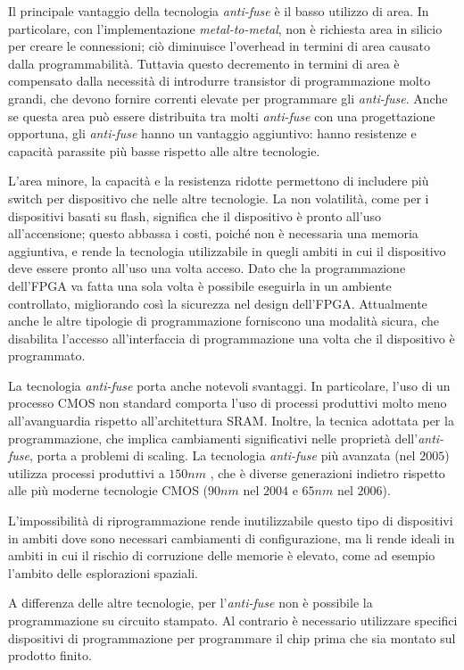 Il principale vantaggio della tecnologia \textit{anti-fuse} è il basso utilizzo di area. In particolare, con l'implementazione \textit{metal-to-metal}, non è richiesta area in silicio per creare le connessioni; ciò diminuisce l'overhead in termini di area causato dalla programmabilità. Tuttavia questo decremento in termini di area è compensato dalla necessità di introdurre transistor di programmazione molto grandi, che devono fornire correnti elevate per programmare gli \textit{anti-fuse}. Anche se questa area può essere distribuita tra molti \textit{anti-fuse} con una progettazione opportuna, gli \textit{anti-fuse} hanno un vantaggio aggiuntivo: hanno resistenze e capacità parassite più basse rispetto alle altre tecnologie.

L'area minore, la capacità e la resistenza ridotte permettono di includere più switch per dispositivo che nelle altre tecnologie. La non volatilità, come per i dispositivi basati su flash, significa che il dispositivo è pronto all'uso all'accensione; questo abbassa i costi, poiché non è necessaria una memoria aggiuntiva, e rende la tecnologia utilizzabile in quegli ambiti in cui il dispositivo deve essere pronto all'uso una volta acceso. Dato che la programmazione dell'FPGA va fatta una sola volta è possibile eseguirla in un ambiente controllato, migliorando così la sicurezza nel design dell'FPGA. Attualmente anche le altre tipologie di programmazione forniscono una modalità sicura, che disabilita l'accesso all'interfaccia di programmazione una volta che il dispositivo è programmato.

La tecnologia \textit{anti-fuse} porta anche notevoli svantaggi. In particolare, l'uso di un processo CMOS non standard comporta l'uso di processi produttivi molto meno all'avanguardia rispetto all'architettura SRAM. Inoltre, la tecnica adottata per la programmazione, che implica cambiamenti significativi nelle proprietà dell'\textit{anti-fuse}, porta a problemi di scaling. La tecnologia \textit{anti-fuse} più avanzata (nel $2005$) utilizza processi produttivi a $150nm$ \cite{axfpga}, che è diverse generazioni indietro rispetto alle più moderne tecnologie CMOS ($90nm$ nel $2004$ e $65nm$ nel $2006$).

L'impossibilità di riprogrammazione rende inutilizzabile questo tipo di dispositivi in ambiti dove sono necessari cambiamenti di configurazione, ma li rende ideali in ambiti in cui il rischio di corruzione delle memorie è elevato, come ad esempio l'ambito delle esplorazioni spaziali.

A differenza delle altre tecnologie, per l'\textit{anti-fuse} non è possibile la programmazione su circuito stampato. Al contrario è necessario utilizzare specifici dispositivi di programmazione per programmare il chip prima che sia montato sul prodotto finito.

